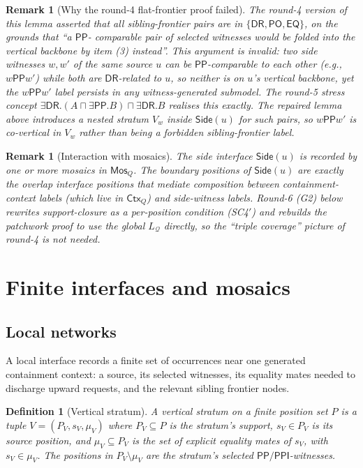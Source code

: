 \documentclass[11pt]{article}
\newtheorem{definition}[theorem]{Definition}
\newtheorem{remark}[theorem]{Remark}
\newcommand{\EQ}{\mathsf{EQ}}
\newcommand{\DR}{\mathsf{DR}}
\newcommand{\PO}{\mathsf{PO}}
\newcommand{\PP}{\mathsf{PP}}
\newcommand{\PPI}{\mathsf{PPI}}
\newcommand{\Q}{\mathcal Q}
\newcommand{\Mos}{\mathsf{Mos}}
\newcommand{\Ctx}{\mathsf{Ctx}}
\newcommand{\Side}{\mathsf{Side}}
\begin{document}
\begin{remark}[Why the round-4 flat-frontier proof failed]
The round-4 version of this lemma asserted that all sibling-frontier
pairs are in $\{\DR,\PO,\EQ\}$, on the grounds that ``a $\PP$-
comparable pair of selected witnesses would be folded into the
vertical backbone by item (3) instead''.  This argument is invalid:
two side witnesses $w,w'$ of the same source $u$ can be
$\PP$-comparable to each other (e.g., $w\PP w'$) while both are
$\DR$-related to $u$, so neither is on $u$'s vertical backbone, yet
the $w\PP w'$ label persists in any witness-generated submodel.  The
round-5 stress concept
$\exists\DR.(A\sqcap\exists\PP.B)\sqcap\exists\DR.B$ realises this
exactly.  The repaired lemma above introduces a nested stratum
$V_w$ inside $\Side(u)$ for such pairs, so $w\PP w'$ is co-vertical
in $V_w$ rather than being a forbidden sibling-frontier label.
\end{remark}

\begin{remark}[Interaction with mosaics]
The side interface $\Side(u)$ is recorded by one or more mosaics
in $\Mos_Q$.  The boundary positions of $\Side(u)$ are exactly the
overlap interface positions that mediate composition between
containment-context labels (which live in $\Ctx_Q$) and
side-witness labels.  Round-6 (G2) below rewrites
support-closure as a per-position condition (SC4$'$) and rebuilds
the patchwork proof to use the global $L_\Q$ directly, so the
``triple coverage'' picture of round-4 is not needed.
\end{remark}

\section{Finite interfaces and mosaics}

\subsection{Local networks}

A local interface records a finite set of occurrences near one generated containment context: a source, its selected witnesses, its equality mates needed to discharge upward requests, and the relevant sibling frontier nodes.

\begin{definition}[Vertical stratum]\label{def:stratum}
A \emph{vertical stratum} on a finite position set $P$ is a tuple
$V=(P_V,s_V,\mu_V)$ where $P_V\subseteq P$ is the stratum's support,
$s_V\in P_V$ is its \emph{source position}, and
$\mu_V\subseteq P_V$ is the set of \emph{explicit equality mates of
$s_V$}, with $s_V\in\mu_V$.  The positions in $P_V\setminus\mu_V$
are the stratum's \emph{selected $\PP/\PPI$-witnesses}.
\end{definition}
\end{document}
